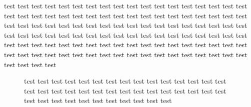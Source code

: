 \documentclass[12pt]{article}
\begin{document}
test test test test test test test test test test test test test test
test test test test test test test test test test test test test test
test test test test test test test test test test test test test test
test test test test test test test test test test test test test test
test test test test test test test test test test test test test test
test test test test test test test test test test test test test test
test test test test test test test test test test test test test test
test test test test test test test test test test test test test test

\begin{figure}

\begin{center}
\framebox[5cm]{}
\end{center}

\caption{test test test test test test test test test test test test test
test test test test test test test test test test test test test test
test test test test test test test test test test test test test test}

\end{figure}
\end{document}
